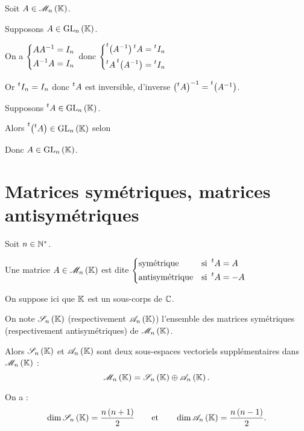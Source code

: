\begin{dem}
Soit \(A\in\M{n}\).

\impdir

Supposons \(A\in\GL{n}\).

On a \(\begin{dcases}
AA^{-1}=I_n \\
A^{-1} A=I_n
\end{dcases}\) donc \(\begin{dcases}
\prescript{t}{}{\left(A^{-1}\right)}\prescript{t}{}{A}=\prescript{t}{}{I_n} \\
\prescript{t}{}{A}\prescript{t}{}{\left(A^{-1}\right)}=\prescript{t}{}{I_n}
\end{dcases}\)

Or \(\prescript{t}{}{I_n}=I_n\) donc \(\prescript{t}{}{A}\) est inversible, d'inverse \(\left(\prescript{t}{}{A}\right)^{-1}=\prescript{t}{}{\left(A^{-1}\right)}\).

\imprec

Supposons \(\trans{A}\in\GL{n}\).

Alors \(\trans{\paren{\trans{A}}}\in\GL{n}\) selon \impdir

Donc \(A\in\GL{n}\).
\end{dem}

\section{Matrices symétriques, matrices antisymétriques}

\begin{defi}
Soit \(n\in\mathbb{N}^*\).

Une matrice \(A\in\M{n}\) est dite \(\begin{dcases}
\text{symétrique} &\text{si }\prescript{t}{}{A}=A \\
\text{antisymétrique} &\text{si }\prescript{t}{}{A}=-A
\end{dcases}\)
\end{defi}

\begin{prop}
On suppose ici que \(\mathbb{K}\) est un sous-corps de \(\mathbb{C}\).

On note \(\sym{n}\) (respectivement \(\antisym{n}\)) l'ensemble des matrices symétriques (respectivement antisymétriques) de \(\M{n}\).

Alors \(\sym{n}\) et \(\antisym{n}\) sont deux sous-espaces vectoriels supplémentaires dans \(\M{n}\) : \[\M{n}=\sym{n}\oplus\antisym{n}.\]

On a : \[\dim\sym{n}=\dfrac{n\paren{n+1}}{2}\qquad\text{et}\qquad\dim\antisym{n}=\dfrac{n\paren{n-1}}{2}.\]
\end{prop}

